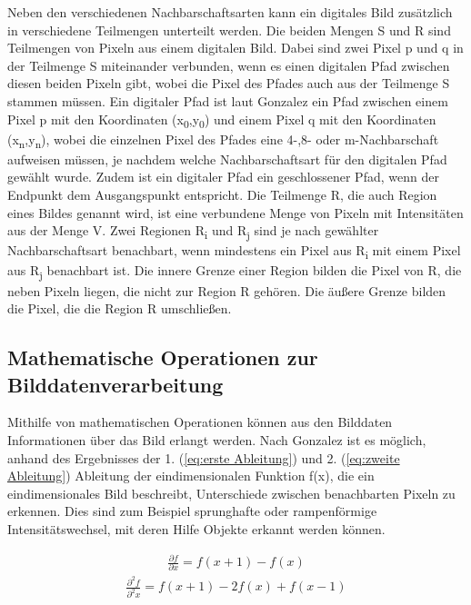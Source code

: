 \documentclass[ngerman,12pt]{article} %
\begin{document}
Neben den verschiedenen Nachbarschaftsarten kann ein digitales Bild zusätzlich in verschiedene Teilmengen unterteilt werden. Die beiden Mengen S und R sind Teilmengen von Pixeln aus einem digitalen Bild. Dabei sind zwei Pixel p und q in der Teilmenge S miteinander verbunden, wenn es einen digitalen Pfad zwischen diesen beiden Pixeln gibt, wobei die Pixel des Pfades auch aus der Teilmenge S stammen müssen. Ein digitaler Pfad ist laut Gonzalez ein Pfad zwischen einem Pixel p mit den Koordinaten (x\textsubscript{0},y\textsubscript{0}) und einem Pixel q mit den Koordinaten (x\textsubscript{n},y\textsubscript{n}), wobei die einzelnen Pixel des Pfades eine 4-,8- oder m-Nachbarschaft aufweisen müssen, je nachdem welche Nachbarschaftsart für den digitalen Pfad gewählt wurde. Zudem ist ein digitaler Pfad ein geschlossener Pfad, wenn der Endpunkt dem Ausgangspunkt entspricht. Die Teilmenge R, die auch Region eines Bildes genannt wird, ist eine verbundene Menge von Pixeln mit Intensitäten aus der Menge V. Zwei Regionen R\textsubscript{i} und R\textsubscript{j} sind je nach gewählter Nachbarschaftsart benachbart, wenn mindestens ein Pixel aus R\textsubscript{i} mit einem Pixel aus R\textsubscript{j} benachbart ist. Die innere Grenze einer Region bilden die Pixel von R, die neben Pixeln liegen, die nicht zur Region R gehören. Die äußere Grenze bilden die Pixel, die die Region R umschließen.



\subsection{Mathematische Operationen zur Bilddatenverarbeitung}
\label{sec:Mathematische Operationen zur Bilddatenverarbeitung}
Mithilfe von mathematischen Operationen können aus den Bilddaten Informationen über das Bild erlangt werden. Nach Gonzalez ist es möglich, anhand des Ergebnisses der 1. (\autoref{eq:erste Ableitung}) und 2. (\autoref{eq:zweite Ableitung}) Ableitung der eindimensionalen Funktion f(x), die ein eindimensionales Bild beschreibt, Unterschiede zwischen benachbarten Pixeln zu erkennen. Dies sind zum Beispiel sprunghafte oder rampenförmige Intensitätswechsel, mit deren Hilfe Objekte erkannt werden können. 

\begin{align}
\label{eq:erste Ableitung}
	\frac{\partial{f}} {\partial{x}} = f(x+1) - f(x)
\end{align}
\begin{align}
\label{eq:zweite Ableitung}
	\frac{\partial^2{f}} {\partial^2{x}} = f(x+1)  - 2 f(x) + f(x-1)
\end{align}
\end{document}
